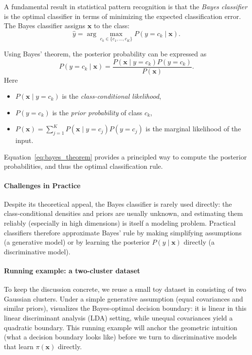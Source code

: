 A fundamental result in statistical pattern recognition is that the \emph{Bayes classifier} is the optimal classifier in terms of minimizing the expected classification error. The Bayes classifier assigns \(\mathbf{x}\) to the class:
\[
\hat{y} = \arg\max_{c_k \in \{c_1,\ldots, c_K\}} P(y = c_k \mid \mathbf{x}).
\]

Using Bayes' theorem, the posterior probability can be expressed as
\begin{equation}
    P(y = c_k \mid \mathbf{x}) = \frac{P(\mathbf{x} \mid y = c_k) P(y = c_k)}{P(\mathbf{x})}.
    \label{eq:bayes_theorem}
\end{equation}
Here
\begin{itemize}
    \item \(P(\mathbf{x} \mid y = c_k)\) is the \emph{class-conditional likelihood},
    \item \(P(y = c_k)\) is the \emph{prior probability} of class \(c_k\),
    \item \(P(\mathbf{x}) = \sum_{j=1}^K P(\mathbf{x} \mid y = c_j) P(y = c_j)\) is the marginal likelihood of the input.
\end{itemize}

Equation~\eqref{eq:bayes_theorem} provides a principled way to compute the posterior probabilities, and thus the optimal classification rule.

\paragraph{Challenges in Practice}
Despite its theoretical appeal, the Bayes classifier is rarely used directly: the class-conditional densities and priors are usually unknown, and estimating them reliably (especially in high dimensions) is itself a modeling problem. Practical classifiers therefore approximate Bayes' rule by making simplifying assumptions (a generative model) or by learning the posterior \(P(y\mid \mathbf{x})\) directly (a discriminative model).

\paragraph{Running example: a two-cluster dataset}
To keep the discussion concrete, we reuse a small toy dataset in  consisting of two Gaussian clusters. Under a simple generative assumption (equal covariances and similar priors),  visualizes the Bayes\hyp{}optimal decision boundary: it is linear in this linear discriminant analysis (LDA) setting, while unequal covariances yield a quadratic boundary. This running example will anchor the geometric intuition (what a decision boundary looks like) before we turn to discriminative models that learn \(\pi(\mathbf{x})\) directly.

